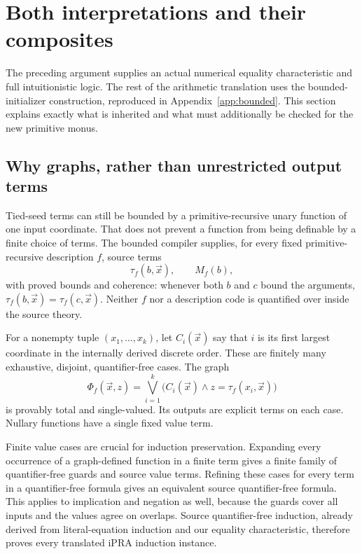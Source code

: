 \section{Both interpretations and their composites}
\label{sec:interpretations}

The preceding argument supplies an actual numerical equality
characteristic and full intuitionistic logic. The rest of the arithmetic
translation uses the bounded-initializer construction, reproduced in
Appendix~\ref{app:bounded}. This section explains exactly what is inherited
and what must additionally be checked for the new primitive monus.

\subsection{Why graphs, rather than unrestricted output terms}
Tied-seed terms can still be bounded by a primitive-recursive unary
function of one input coordinate. That does not prevent a function from
being definable by a finite choice of terms. The bounded compiler supplies,
for every fixed primitive-recursive description $f$, source terms
\[
 \tau_f(b,\vec x),\qquad M_f(b),
\]
with proved bounds and coherence: whenever both $b$ and $c$ bound the
arguments, $\tau_f(b,\vec x)=\tau_f(c,\vec x)$. Neither $f$ nor a
description code is quantified over inside the source theory.

For a nonempty tuple $(x_1,\ldots,x_k)$, let $C_i(\vec x)$ say that $i$
is its first largest coordinate in the internally derived discrete
order. These are finitely many exhaustive, disjoint, quantifier-free
cases. The graph
\[
 \Phi_f(\vec x,z)=\bigvee_{i=1}^k
       \bigl(C_i(\vec x)\land z=\tau_f(x_i,\vec x)\bigr)
\]
is provably total and single-valued. Its outputs are explicit terms on
each case. Nullary functions have a single fixed value term.

Finite value cases are crucial for induction preservation. Expanding
every occurrence of a graph-defined function in a finite term gives a
finite family of quantifier-free guards and source value terms. Refining
these cases for every term in a quantifier-free formula gives an
equivalent source quantifier-free formula. This applies to implication
and negation as well, because the guards cover all inputs and the values
agree on overlaps. Source quantifier-free induction, already derived
from literal-equation induction and our equality characteristic,
therefore proves every translated iPRA induction instance.

